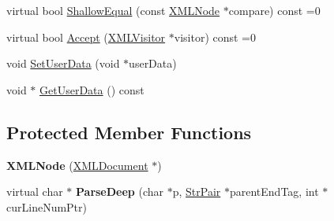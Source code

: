 \begin{DoxyCompactItemize}
\item 
virtual bool \mbox{\hyperlink{classtinyxml2_1_1_x_m_l_node_a7ce18b751c3ea09eac292dca264f9226}{Shallow\+Equal}} (const \mbox{\hyperlink{classtinyxml2_1_1_x_m_l_node}{X\+M\+L\+Node}} $\ast$compare) const =0
\item 
virtual bool \mbox{\hyperlink{classtinyxml2_1_1_x_m_l_node_a81e66df0a44c67a7af17f3b77a152785}{Accept}} (\mbox{\hyperlink{classtinyxml2_1_1_x_m_l_visitor}{X\+M\+L\+Visitor}} $\ast$visitor) const =0
\item 
void \mbox{\hyperlink{classtinyxml2_1_1_x_m_l_node_a002978fc889cc011d143185f2377eca2}{Set\+User\+Data}} (void $\ast$user\+Data)
\item 
void $\ast$ \mbox{\hyperlink{classtinyxml2_1_1_x_m_l_node_a7f0687574afa03bc479dc44f29db0afe}{Get\+User\+Data}} () const
\end{DoxyCompactItemize}
\subsection*{Protected Member Functions}
\begin{DoxyCompactItemize}
\item 
\mbox{\label{classtinyxml2_1_1_x_m_l_node_a29868df6ca383d574f584dfdd15105b6}} 
{\bfseries X\+M\+L\+Node} (\mbox{\hyperlink{classtinyxml2_1_1_x_m_l_document}{X\+M\+L\+Document}} $\ast$)
\item 
\mbox{\label{classtinyxml2_1_1_x_m_l_node_a916e498914baecbc9a1f012352ef7c69}} 
virtual char $\ast$ {\bfseries Parse\+Deep} (char $\ast$p, \mbox{\hyperlink{classtinyxml2_1_1_str_pair}{Str\+Pair}} $\ast$parent\+End\+Tag, int $\ast$cur\+Line\+Num\+Ptr)
\end{DoxyCompactItemize}
